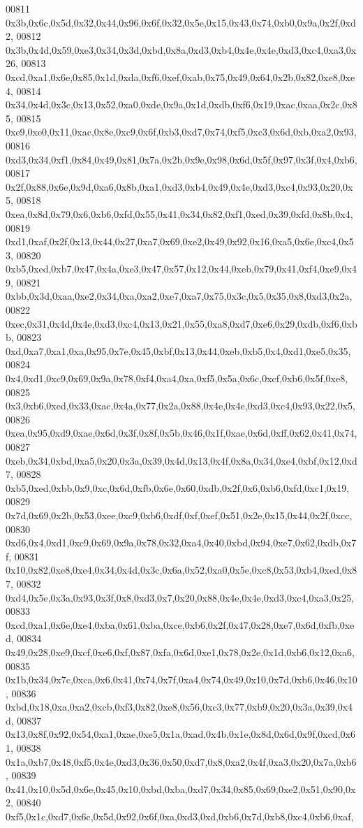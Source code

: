 \begin{DoxyCode}
00811   0x3b,0x6c,0x5d,0x32,0x44,0x96,0x6f,0x32,0x5e,0x15,0x43,0x74,0xb0,0x9a,0x2f,0xd2,
00812   0x3b,0x4d,0x59,0xe3,0x34,0x3d,0xbd,0x8a,0xd3,0xb4,0x4e,0x4e,0xd3,0xc4,0xa3,0x26,
00813   0xcd,0xa1,0x6e,0x85,0x1d,0xda,0xf6,0xef,0xab,0x75,0x49,0x64,0x2b,0x82,0xe8,0xe4,
00814   0x34,0x4d,0x3c,0x13,0x52,0xa0,0xde,0x9a,0x1d,0xdb,0xf6,0x19,0xac,0xaa,0x2c,0x85,
00815   0xe9,0xe0,0x11,0xac,0x8e,0xc9,0x6f,0xb3,0xd7,0x74,0xf5,0xc3,0x6d,0xb,0xa2,0x93,
00816   0xd3,0x34,0xf1,0x84,0x49,0x81,0x7a,0x2b,0x9e,0x98,0x6d,0x5f,0x97,0x3f,0x4,0xb6,
00817   0x2f,0x88,0x6e,0x9d,0xa6,0x8b,0xa1,0xd3,0xb4,0x49,0x4e,0xd3,0xc4,0x93,0x20,0x5,
00818   0xea,0x8d,0x79,0x6,0xb6,0xfd,0x55,0x41,0x34,0x82,0xf1,0xed,0x39,0xfd,0x8b,0x4,
00819   0xd1,0xaf,0x2f,0x13,0x44,0x27,0xa7,0x69,0xe2,0x49,0x92,0x16,0xa5,0x6e,0xc4,0x53,
00820   0xb5,0xed,0xb7,0x47,0x4a,0xe3,0x47,0x57,0x12,0x44,0xeb,0x79,0x41,0xf4,0xe9,0x49,
00821   0xbb,0x3d,0xaa,0xe2,0x34,0xa,0xa2,0xe7,0xa7,0x75,0x3c,0x5,0x35,0x8,0xd3,0x2a,
00822   0xec,0x31,0x4d,0x4e,0xd3,0xc4,0x13,0x21,0x55,0xa8,0xd7,0xe6,0x29,0xdb,0xf6,0xbb,
00823   0xd,0xa7,0xa1,0xa,0x95,0x7e,0x45,0xbf,0x13,0x44,0xeb,0xb5,0x4,0xd1,0xe5,0x35,
00824   0x4,0xd1,0xc9,0x69,0x9a,0x78,0xf4,0xa4,0xa,0xf5,0x5a,0x6c,0xcf,0xb6,0x5f,0xe8,
00825   0x3,0xb6,0xed,0x33,0xac,0x4a,0x77,0x2a,0x88,0x4e,0x4e,0xd3,0xc4,0x93,0x22,0x5,
00826   0xea,0x95,0xd9,0xae,0x6d,0x3f,0x8f,0x5b,0x46,0x1f,0xae,0x6d,0xff,0x62,0x41,0x74,
00827   0xeb,0x34,0xbd,0xa5,0x20,0x3a,0x39,0x4d,0x13,0x4f,0x8a,0x34,0xe4,0xbf,0x12,0xd7,
00828   0xb5,0xed,0xbb,0x9,0xc,0x6d,0xfb,0x6e,0x60,0xdb,0x2f,0x6,0xb6,0xfd,0xc1,0x19,
00829   0x7d,0x69,0x2b,0x53,0xee,0xc9,0xb6,0xdf,0xf,0xef,0x51,0x2e,0x15,0x44,0x2f,0xcc,
00830   0xd6,0x4,0xd1,0xc9,0x69,0x9a,0x78,0x32,0xa4,0x40,0xbd,0x94,0xe7,0x62,0xdb,0x7f,
00831   0x10,0x82,0xe8,0xe4,0x34,0x4d,0x3c,0x6a,0x52,0xa0,0x5e,0xc8,0x53,0xb4,0xed,0x87,
00832   0xd4,0x5e,0x3a,0x93,0x3f,0x8,0xd3,0x7,0x20,0x88,0x4e,0x4e,0xd3,0xc4,0xa3,0x25,
00833   0xcd,0xa1,0x6e,0xe4,0xba,0x61,0xba,0xce,0xb6,0x2f,0x47,0x28,0xe7,0x6d,0xfb,0xed,
00834   0x49,0x28,0xe9,0xcf,0xe6,0xf,0x87,0xfa,0x6d,0xe1,0x78,0x2e,0x1d,0xb6,0x12,0xa6,
00835   0x1b,0x34,0x7c,0xca,0x6,0x41,0x74,0x7f,0xa4,0x74,0x49,0x10,0x7d,0xb6,0x46,0x10,
00836   0xbd,0x18,0xa,0xa2,0xcb,0xf3,0x82,0xe8,0x56,0xc3,0x77,0xb9,0x20,0x3a,0x39,0x4d,
00837   0x13,0x8f,0x92,0x54,0xa1,0xae,0xe5,0x1a,0xad,0x4b,0x1e,0x8d,0x6d,0x9f,0xcd,0x61,
00838   0x1a,0xb7,0x48,0xf5,0x4e,0xd3,0x36,0x50,0xd7,0x8,0xa2,0x4f,0xa3,0x20,0x7a,0xb6,
00839   0x41,0x10,0x5d,0x6e,0x45,0x10,0xbd,0xba,0xd7,0x34,0x85,0x69,0xe2,0x51,0x90,0x2,
00840   0xf5,0x1c,0xd7,0x6c,0x5d,0x92,0x6f,0xa,0xd3,0xd,0xb6,0x7d,0xb8,0xc4,0xb6,0xaf,

\end{DoxyCode}
